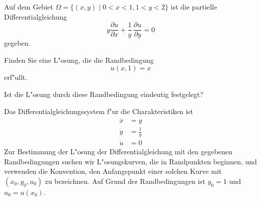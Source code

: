 Auf dem Gebiet $\Omega=\{(x,y)\;|\;0<x<1,1<y<2\}$ ist die partielle Differentialgleichung
\begin{equation}
y\frac{\partial u}{\partial x}+\frac1y\,\frac{\partial u}{\partial y}=0
\label{30000009:gleichung}
\end{equation}
gegeben.
\begin{teilaufgaben}
\item Finden Sie eine L"osung, die die Randbedingung
\[
u(x,1)=x
\]
erf"ullt.
\item Ist die L"osung durch diese Randbedingung eindeutig festgelegt?
\end{teilaufgaben}

\begin{loesung}
\begin{teilaufgaben}
\item
Das Differentialgleichungssystem f"ur die Charakteristiken ist
\begin{align}
\dot x &= y\label{30000009:1}\\
\dot y &= \frac1y\label{30000009:2}\\
\dot u &= 0\label{30000009:3}
\end{align}
Zur Bestimmung der L"osung der Differentialgleichung
mit den gegebenen Randbedingungen
suchen wir L"osungskurven, die in Randpunkten beginnen, und verwenden
die Konvention, den Anfangspunkt einer solchen Kurve mit $(x_0,y_0,u_0)$
zu bezeichnen. Auf Grund der Randbedingungen ist $y_0=1$ und $u_0=u(x_0)$.


\end{teilaufgaben}
\end{loesung}
